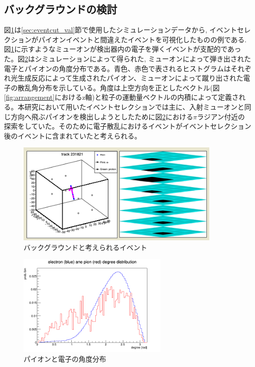 \subsection{バックグラウンドの検討}\label{sec:anal:background}
図\ref{fig:anal:bg01}は\ref{sec:eventcut_val}節で使用したシミュレーションデータから, イベントセレクションがパイオンイベントと間違えたイベントを可視化したものの例である.図\ref{fig:anal:bg01}に示すようなミューオンが検出器内の電子を弾くイベントが支配的であった。図\ref{fig:pion_electron_degrere}はシミュレーションによって得られた, ミューオンによって弾き出された電子とパイオンの角度分布である。青色、赤色で表されるヒストグラムはそれぞれ光生成反応によって生成されたパイオン、ミューオンによって蹴り出された電子の散乱角分布を示している。角度は上空方向を正としたベクトル(図\ref{fig:arrangement}におけるz軸)と粒子の運動量ベクトルの内積によって定義される。本研究において用いたイベントセレクションでは主に、入射ミューオンと同じ方向へ飛ぶパイオンを検出しようとしたために図\ref{fig:pion_electron_degrere}における$\pi$ラジアン付近の探索をしていた。そのために電子散乱におけるイベントがイベントセレクション後のイベントに含まれていたと考えられる。
\begin{figure}[H]
    \centering
    \includegraphics[height=5.0cm]{img/anal_bg01.png}
    \caption{バックグラウンドと考えられるイベント}
    \label{fig:anal:bg01}
\end{figure}
\begin{figure}[H]
    \centering
    \includegraphics[height=5.0cm]{img/pi_e_degree.png}
    \caption{パイオンと電子の角度分布}
    \label{fig:pion_electron_degrere}
\end{figure}